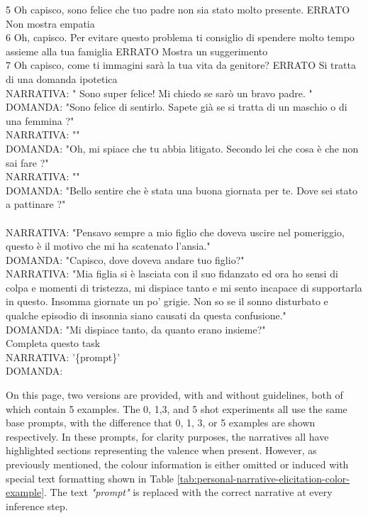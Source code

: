 \begin{itemize}
{       5	Oh capisco, sono felice che tuo padre non sia stato molto presente.	ERRATO	Non mostra empatia\\
       6	Oh, capisco. Per evitare questo problema ti consiglio di spendere molto tempo assieme alla tua famiglia	ERRATO	Mostra un suggerimento\\
       7	Oh capisco, come ti immagini sarà la tua vita da genitore?	ERRATO	Si tratta di una domanda ipotetica\\
      NARRATIVA: " Sono super felice! Mi chiedo se sarò un bravo padre. "\\
       DOMANDA: "Sono felice di sentirlo. Sapete già se si tratta di un maschio o di una femmina ?"\\
       NARRATIVA: ""\\
       DOMANDA: "Oh, mi spiace che tu abbia litigato. Secondo lei che cosa è che non sai fare ?"\\
       NARRATIVA: ""\\
       DOMANDA: "Bello sentire che è stata una buona giornata per te. Dove sei stato a pattinare ?"\\
       \\
       NARRATIVA: "Pensavo sempre a mio figlio che doveva uscire nel pomeriggio, questo è il motivo che mi ha scatenato l’ansia."\\
       DOMANDA: "Capisco, dove doveva andare tuo figlio?"\\
       NARRATIVA: "Mia figlia si è lasciata con il suo fidanzato ed ora ho sensi di colpa e momenti di tristezza, mi dispiace tanto e mi sento incapace di supportarla in questo. Insomma giornate un po’ grigie. Non so se il sonno disturbato e qualche episodio di insonnia siano causati da questa confusione."\\
       DOMANDA: "Mi dispiace tanto, da quanto erano insieme?"\\
       Completa questo task\\
       NARRATIVA:  '\{prompt\}'\\
       DOMANDA:}
\end{itemize}
On this page, two versions are provided, with and without guidelines, both of which contain 5 examples. The 0, 1,3, and 5 shot experiments all use the same base prompts, with the difference that 0, 1, 3, or 5 examples are shown respectively. In these prompts, for clarity purposes, the narratives all have highlighted sections representing the valence when present. However, as previously mentioned, the colour information is either omitted or induced with special text formatting shown in Table \ref{tab:personal-narrative-elicitation-color-example}. The text \emph{"prompt"} is replaced with the correct narrative at every inference step.
